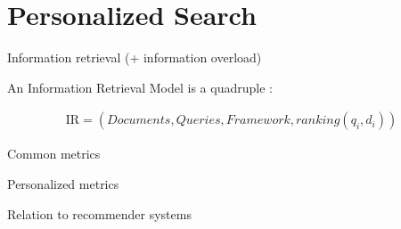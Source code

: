 \section{Personalized Search}

Information retrieval (+ information overload)

An Information Retrieval Model is a quadruple \citep[p23]{Baeza-Yates1999}:

\begin{eqnarray}
  \mathrm{IR} = (Documents, Queries, Framework, ranking(q_i, d_i))
\end{eqnarray}

Common metrics

Personalized metrics

Relation to recommender systems




